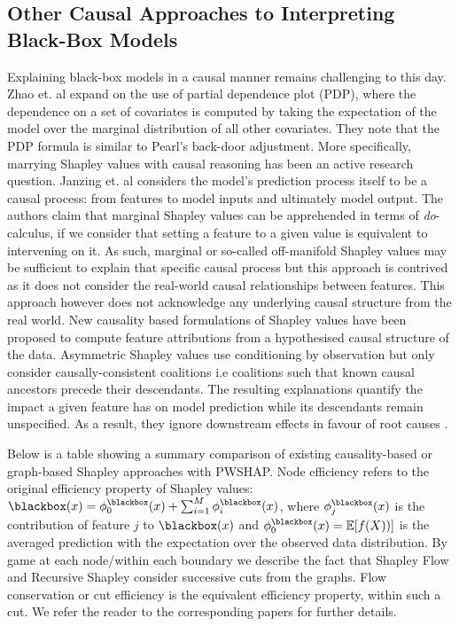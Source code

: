 \documentclass{article}
\theoremstyle{plain}
\theoremstyle{definition}
\theoremstyle{remark}
\theoremstyle{mystyle}
\begin{document}
\subsection{Other Causal Approaches to Interpreting Black-Box Models} 
\label{subsec:further_causal}
Explaining black-box models in a causal manner remains challenging to this day. Zhao et. al  expand on the use of partial dependence plot (PDP), where the dependence on a set of covariates is computed by taking the expectation of the model over the marginal distribution of all other covariates. They note that the PDP formula is similar to Pearl’s back-door adjustment. More specifically, marrying Shapley values with causal reasoning has been an active research question. Janzing et. al  considers the model’s prediction process itself to be a causal process: from features to model inputs and ultimately model output. The authors claim that marginal Shapley values can be apprehended in terms of \textit{do}-calculus, if we consider that setting a feature to a given value is equivalent to intervening on it. As such, marginal or so-called off-manifold Shapley values may be sufficient to explain that specific causal process but this approach is contrived as it does not consider the real-world causal relationships between features. This approach however does not acknowledge any underlying causal structure from the real world. New causality based formulations of Shapley values have been proposed to compute feature attributions from a hypothesised causal structure of the data. Asymmetric Shapley values  use conditioning by observation but only consider causally-consistent coalitions i.e coalitions such that known causal ancestors precede their descendants. The resulting explanations quantify the impact a given feature has on model prediction while its descendants remain unspecified. As a result, they ignore downstream effects in favour of root causes . 

Below is a table showing a summary comparison of existing causality-based or graph-based Shapley approaches with PWSHAP.
Node efficiency refers to the original efficiency property of Shapley values: $\blackbox(x)=\phi^{\blackbox}_{0}(x)+\sum_{i=1}^{M} \phi^{\blackbox}_{i}(x)$, where $\phi^{\blackbox}_{j}(x)$ is the contribution of feature $j$ to $\blackbox(x)$ and $\phi^{\blackbox}_{0}(x)=\mathbb{E} [f(X))]$ is the averaged prediction with the expectation over the observed data distribution. By game at each node/within each boundary we describe the fact that Shapley Flow and Recursive Shapley consider successive cuts from the graphs. Flow conservation or cut efficiency is the equivalent efficiency property, within such a cut. We refer the reader to the corresponding papers for further details. 
\end{document}
